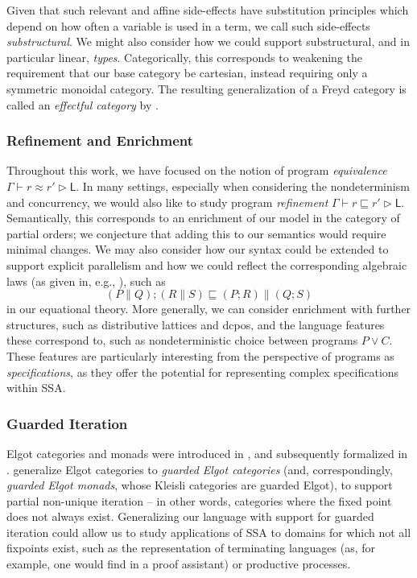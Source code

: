 \documentclass[acmsmall,screen,review]{acmart}
\newcommand{\ms}[1]{\ensuremath{\mathsf{#1}}}
\newcommand{\haslb}[3]{#1 \vdash #2 \rhd #3}
\newcommand{\teqv}{\approx}
\newcommand{\lbeq}[4]{#1 \vdash #2 \teqv #3 \rhd {#4}}
\begin{document}
Given that such relevant and affine side-effects have substitution principles which depend on how
often a variable is used in a term, we call such side-effects \emph{substructural}. We might also
consider how we could support substructural, and in particular linear, \emph{types}. Categorically,
this corresponds to weakening the requirement that our base category be cartesian, instead requiring
only a symmetric monoidal category. The resulting generalization of a Freyd category is called an
\emph{effectful category} by \citet{promonad}.

\subsubsection{Refinement and Enrichment}

Throughout this work, we have focused on the notion of program \emph{equivalence}
$\lbeq{\Gamma}{r}{r'}{\ms{L}}$. In many settings, especially when considering the nondeterminism and
concurrency, we would also like to study program \emph{refinement} $\haslb{\Gamma}{r \sqsubseteq
r'}{\ms{L}}$. Semantically, this corresponds to an enrichment of our model in the category of
partial orders; we conjecture that adding this to our semantics would require minimal changes. We
may also consider how our syntax could be extended to support explicit parallelism and how we could
reflect the corresponding algebraic laws (as given in, e.g., \citet{hoare-parallel-14}), such as
\begin{equation}
  (P \parallel Q) ; (R \parallel S) \sqsubseteq (P ; R) \parallel (Q ; S)
\end{equation}
in our equational theory. More generally, we can consider enrichment with further structures, such
as distributive lattices and dcpos, and the language features these correspond to, such as
nondeterministic choice between programs $P \lor C$. These features are particularly interesting
from the perspective of programs as \emph{specifications}, as they offer the potential for
representing complex specifications within SSA.

\subsubsection{Guarded Iteration}

Elgot categories and monads were introduced in \citet{elgot-elgot-75}, and subsequently formalized
in \citet{adamek-elgot-11}. \citet{coinductive-resumption-levy-goncharov-19} generalize Elgot
categories to \emph{guarded Elgot categories} (and, correspondingly, \emph{guarded Elgot monads},
whose Kleisli categories are guarded Elgot), to support partial non-unique iteration -- in other words,
categories where the fixed point does not always exist. Generalizing
our language with support for guarded iteration could allow us to study applications of SSA to
domains for which not all fixpoints exist, such as the representation of terminating languages (as,
for example, one would find in a proof assistant) or productive processes. 
\end{document}
